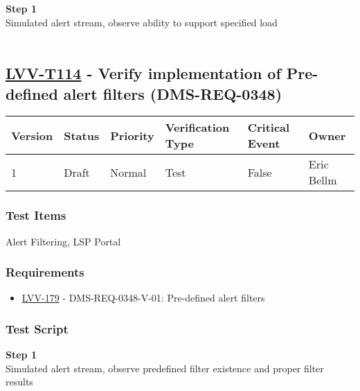 \textbf{Step 1}\\
Simulated alert stream, observe ability to support specified load\\
~\\

\hypertarget{lvv-t114---verify-implementation-of-pre-defined-alert-filters-dms-req-0348}{%
\subsection{\texorpdfstring{\href{https://jira.lsstcorp.org/secure/Tests.jspa\#/testCase/LVV-T114}{LVV-T114}
- Verify implementation of Pre-defined alert filters
(DMS-REQ-0348)}{LVV-T114 - Verify implementation of Pre-defined alert filters (DMS-REQ-0348)}}\label{lvv-t114---verify-implementation-of-pre-defined-alert-filters-dms-req-0348}}

\begin{longtable}[]{@{}llllll@{}}
\toprule
Version & Status & Priority & Verification Type & Critical Event &
Owner\tabularnewline
\midrule
\endhead
1 & Draft & Normal & Test & False & Eric Bellm\tabularnewline
\bottomrule
\end{longtable}

\hypertarget{test-items-90}{%
\subsubsection{Test Items}\label{test-items-90}}

Alert Filtering, LSP Portal~

\hypertarget{requirements-91}{%
\subsubsection{Requirements}\label{requirements-91}}

\begin{itemize}
\tightlist
\item
  \href{https://jira.lsstcorp.org/browse/LVV-179}{LVV-179} -
  DMS-REQ-0348-V-01: Pre-defined alert filters
\end{itemize}

\hypertarget{test-script-91}{%
\subsubsection{Test Script}\label{test-script-91}}

\textbf{Step 1}\\
Simulated alert stream, observe predefined filter existence and proper
filter results\\
~\\

